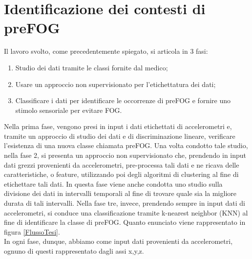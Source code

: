 

\chapter[Identificazione dei contesti di preFOG]{Identificazione dei contesti di preFOG}\label{chap5:Automatic}
Il lavoro svolto, come precedentemente spiegato, si articola in 3 fasi:
\begin{enumerate}
	\item Studio dei dati tramite le classi fornite dal medico;
	\item Usare un approccio non supervisionato per l'etichettatura dei dati;
	\item Classificare i dati per identificare le occorrenze di preFOG e fornire uno stimolo sensoriale per evitare FOG.
\end{enumerate}
Nella prima fase, vengono presi in input i dati etichettati di accelerometri e, tramite un approccio di studio dei dati e di discriminazione lineare, verificare l'esistenza di una nuova classe chiamata preFOG. Una volta condotto tale studio, nella fase 2, si presenta un approccio non supervisionato che, prendendo in input dati grezzi provenienti da accelerometri, pre-processa tali dati e ne ricava delle caratteristiche, o feature, utilizzando poi degli algoritmi di clustering al fine di etichettare tali dati. In questa fase viene anche condotta uno studio sulla divisione dei dati in intervalli temporali al fine di trovare quale sia la migliore durata di tali intervalli. Nella fase tre, invece, prendendo sempre in input dati di accelerometri, si conduce una classificazione tramite k-nearest neighbor (KNN) al fine di identificare la classe di preFOG. Quanto enunciato viene rappresentato in figura \ref{FlussoTesi}.\\
In ogni fase, dunque, abbiamo come input dati provenienti da accelerometri, ognuno di questi rappresentato dagli assi x,y,z.\\
